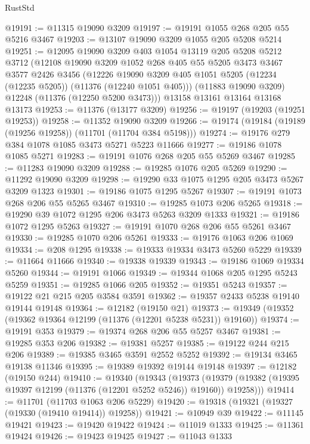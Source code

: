 \begin{lexlean}{RustStd}
\begin{coremodule}
{\begin{coremodule}
{{{{{{{{{{{{{{{{{{{{{{{{{{{{{{{{{{{{{{{{{{{{{{{{{{{{{{{{{{{{{{{{{{{{{{{{{{{{{{{{{{{{{@19191 := @11315 @19090 @3209
@19197 := @19191 @1055 @268 @205 @55 @5216 @3467
@19203 := @13107 @19090 @3209 @1055 @205 @5208 @5214
@19251 := @12095
    @19090
    @3209
    @403
    @1054
    @13119
    @205
    @5208
    @5212
    @3712
    (@12108
      @19090
      @3209
      @1052
      @268
      @405
      @55
      @5205
      @3473
      @3467
      @3577
      @2426
      @3456
      (@12226 @19090 @3209 @405 @1051 @5205 (@12234 (@12235 @5205)) (@11376 (@12240 @1051 @405)))
      (@11883 @19090 @3209)
      @12248
      (@11376 (@12250 @5200 @3473)))
    @13158
    @13161
    @13164
    @13168
    @13173
@19253 := @11376 (@13177 @3209)
@19256 := @19197 (@19203 (@19251 @19253))
@19258 := @11352 @19090 @3209
@19266 := @19174 (@19184 (@19189 (@19256 @19258)) (@11701 (@11704 @384 @5198)))
@19274 := @19176 @279 @384 @1078 @1085 @3473 @5271 @5223 @11666
@19277 := @19186 @1078 @1085 @5271
@19283 := @19191 @1076 @268 @205 @55 @5269 @3467
@19285 := @11283 @19090 @3209
@19288 := @19285 @1076 @205 @5269
@19290 := @11292 @19090 @3209
@19298 := @19290 @33 @1075 @1295 @205 @3473 @5267 @3209 @1323
@19301 := @19186 @1075 @1295 @5267
@19307 := @19191 @1073 @268 @206 @55 @5265 @3467
@19310 := @19285 @1073 @206 @5265
@19318 := @19290 @39 @1072 @1295 @206 @3473 @5263 @3209 @1333
@19321 := @19186 @1072 @1295 @5263
@19327 := @19191 @1070 @268 @206 @55 @5261 @3467
@19330 := @19285 @1070 @206 @5261
@19333 := @19176 @1063 @206 @1069
@19334 := @208 @1295
@19338 := @19333 @19334 @3473 @5260 @5229
@19339 := @11664 @11666
@19340 := @19338 @19339
@19343 := @19186 @1069 @19334 @5260
@19344 := @19191 @1066
@19349 := @19344 @1068 @205 @1295 @5243 @5259
@19351 := @19285 @1066 @205
@19352 := @19351 @5243
@19357 := @19122 @21 @215 @205 @3584 @3591
@19362 := @19357 @2433 @5238 @19140 @19144 @19148
@19364 := @12182 (@19150 @21)
@19373 := @19349 (@19352 (@19362 @19364 @12199 (@11376 (@12201 @5238 @5231)) @19160))
@19374 := @19191 @353
@19379 := @19374 @268 @206 @55 @5257 @3467
@19381 := @19285 @353 @206
@19382 := @19381 @5257
@19385 := @19122 @244 @215 @206
@19389 := @19385 @3465 @3591 @2552 @5252
@19392 := @19134 @3465 @19138 @11346
@19395 := @19389 @19392 @19144 @19148
@19397 := @12182 (@19150 @244)
@19410 := @19340
    (@19343
      (@19373 (@19379 (@19382 (@19395 @19397 @12199 (@11376 (@12201 @5252 @5246)) @19160)) @19258)))
@19414 := @11701 (@11703 @1063 @206 @5229)
@19420 := @19318 (@19321 (@19327 (@19330 (@19410 @19414)) @19258))
@19421 := @10949 @39
@19422 := @11145 @19421
@19423 := @19420 @19422
@19424 := @11019 @1333
@19425 := @11361 @19424
@19426 := @19423 @19425
@19427 := @11043 @1333
}}}}}}}}}}}}}}}}}}}}}}}}}}}}}}}}}}}}}}}}}}}}}}}}}}}}}}}}}}}}}}}}}}}}}}}}}}}}}}}}}}}}}
\end{coremodule}}
\end{coremodule}
\end{lexlean}
